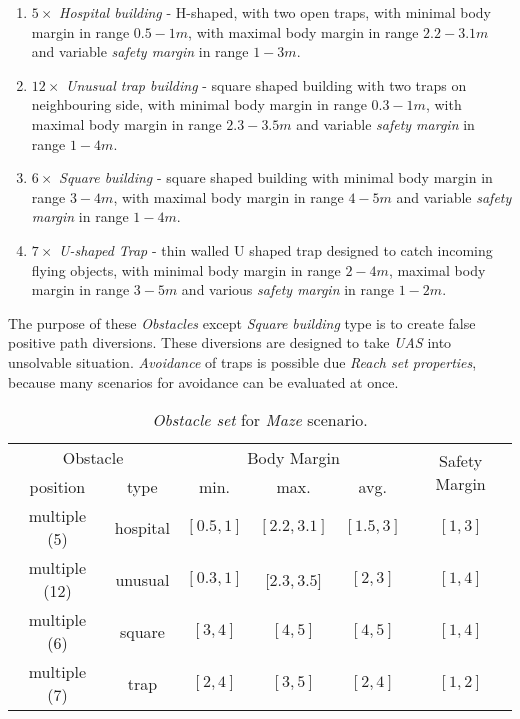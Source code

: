 \begin{enumerate}
    \item $5\times$  \emph{Hospital building} - H-shaped, with two open traps, with minimal body margin in range $0.5 - 1m$, with maximal body margin in range $2.2 - 3.1 m$ and variable \emph{safety margin} in range $1-3 m$.
    
    \item $12\times$ \emph{Unusual trap building} - square shaped building with two traps on neighbouring side, with minimal body margin in range $0.3 - 1m$, with maximal body margin in range $2.3 - 3.5 m$ and variable \emph{safety margin} in range $1-4 m$.
    
    \item $6\times$  \emph{Square building} - square shaped building with minimal body margin in range $3-4 m$, with maximal body margin in range $4-5 m$ and variable \emph{safety margin} in range $1-4m$.
    
    \item $7\times$  \emph{U-shaped Trap} - thin walled U shaped trap designed to catch incoming flying objects, with minimal body margin in range $2-4m$, maximal body margin in range $3-5 m$ and various \emph{safety margin} in range $1-2 m$.
\end{enumerate}

The purpose of these \emph{Obstacles} except \emph{Square building} type is to create false positive path diversions. These diversions are designed to take \emph{UAS} into unsolvable situation. \emph{Avoidance} of traps is possible due \emph{Reach set properties}, because many scenarios for avoidance can be evaluated at once.

\begin{table}[H]
    \centering
    \begin{tabular}{c|c|c|c|c|c}
        \multicolumn{2}{c|}{Obstacle} & \multicolumn{3}{c|}{Body Margin} & \multirow{2}{*}{Safety Margin}\\\cline{1-5}
        position & type & min. & max. & avg. &   \\\hline\hline
        multiple (5) & hospital & $[0.5,1]$ & $[2.2,3.1]$ & $[1.5,3]$  & $[1,3]$ \\\hline 
        multiple (12) & unusual  & $[0.3,1]$ & $[2.3,3.5$] & $[2,3]$    & $[1,4]$ \\\hline
        multiple (6) & square   & $[3,4]$   & $[4,5]$     & $[4,5]$    & $[1,4]$ \\\hline
        multiple (7) & trap     & $[2,4]$   & $[3,5]$     & $[2,4]$    & $[1,2]$ \\
     \end{tabular}
    \caption{\emph{Obstacle set} for \emph{Maze} scenario.}
    \label{tab:obstacleSetMaze}
\end{table}

